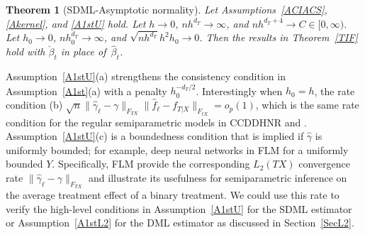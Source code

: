 \documentclass[lettersize, 12pt]{article}
\newtheorem{theorem}{Theorem}
\begin{document}
\begin{theorem}[SDML-Asymptotic normality] 
Let Assumptions~\ref{ACIACS}, \ref{Akernel}, and \ref{A1stU} hold.
Let $h \rightarrow 0$, $nh^{d_T} \rightarrow\infty$, and $nh^{d_T+4} \rightarrow C \in [0,\infty)$.
Let $h_0\rightarrow 0$, $nh_0^{d_T} \rightarrow\infty$, and $\sqrt{nh^{d_T}}h^2h_0 \rightarrow 0$.
Then 
the results in Theorem~\ref{TIF} hold with $\check\beta_t$ in place of~$\hat\beta_t$.
\label{TIF-SDML}
 \end{theorem}

Assumption~\ref{A1stU}(a) strengthens the consistency condition in Assumption~\ref{A1st}(a) with a penalty $h_0^{-d_T/2}$. 
Interestingly when $h_0 = h$, the rate condition (b) $\sqrt{n}\|\hat\gamma_\ell-\gamma\|_{F_{TX}}
\|\hat f_\ell - f_{T|X}\|_{F_{tX}} = o_p(1)$, which is the same rate condition
for the regular semiparametric models in CCDDHNR and \cite{CNS21ADML}.
Assumption~\ref{A1stU}(c) is a boundedness condition that is implied if $\hat\gamma$ is uniformly bounded;
for example, deep neural networks in FLM for a uniformly bounded $Y$.
Specifically, 
FLM provide the corresponding $L_2(TX)$ convergence rate $\|\hat \gamma_\ell -\gamma\|_{F_{TX}}$
and illustrate its usefulness for semiparametric inference on the average treatment effect of a binary treatment.
We could use this rate to verify the high-level conditions in Assumption~\ref{A1stU} for the SDML estimator
or Assumption~\ref{A1stL2} for the DML estimator as discussed in Section~\ref{SecL2}.
\end{document}
